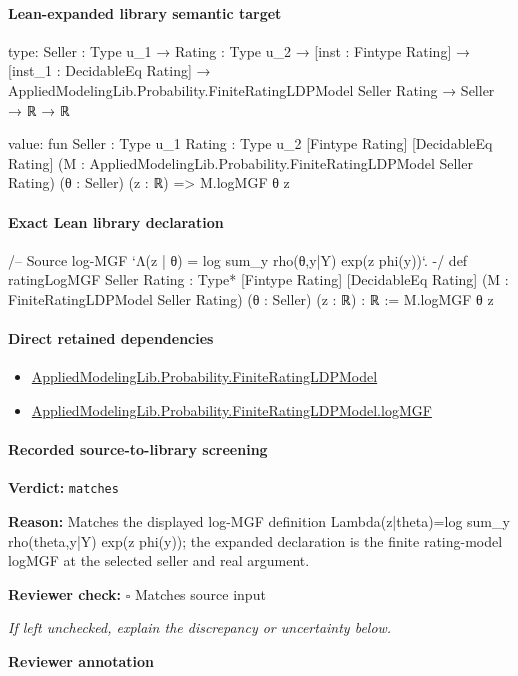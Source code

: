 \documentclass[10pt]{article}
\newcommand{\reviewerbox}{%
  \par\noindent\fbox{\parbox{0.96\linewidth}{\rule{0pt}{0.38in}}}\par
}
\newcommand{\reviewmatch}[1]{%
  \par\noindent\textbf{Reviewer check:} $\square$\; #1\par
  \noindent\emph{If left unchecked, explain the discrepancy or uncertainty below.}\par
}
\begin{document}
\paragraph{Lean-expanded library semantic target}
\begin{ReviewVerbatim}
type:
{Seller : Type u_1} →
  {Rating : Type u_2} →
    [inst : Fintype Rating] →
      [inst_1 : DecidableEq Rating] → AppliedModelingLib.Probability.FiniteRatingLDPModel Seller Rating → Seller → ℝ → ℝ

value:
fun {Seller : Type u_1} {Rating : Type u_2} [Fintype Rating] [DecidableEq Rating]
    (M : AppliedModelingLib.Probability.FiniteRatingLDPModel Seller Rating) (θ : Seller) (z : ℝ) =>
  M.logMGF θ z
\end{ReviewVerbatim}

\paragraph{Exact Lean library declaration}
\begin{ReviewVerbatim}
/-- Source log-MGF `Λ(z | θ) = log sum_y rho(θ,y|Y) exp(z phi(y))`. -/
def ratingLogMGF {Seller Rating : Type*} [Fintype Rating] [DecidableEq Rating]
    (M : FiniteRatingLDPModel Seller Rating) (θ : Seller) (z : ℝ) : ℝ :=
  M.logMGF θ z
\end{ReviewVerbatim}

\paragraph{Direct retained dependencies}
\begin{itemize}\raggedright
\item \hyperlink{governing-declaration-765e92a42a7a9947}{Applied\allowbreak{}Modeling\allowbreak{}Lib.\allowbreak{}Probability.\allowbreak{}Finite\allowbreak{}Rating\allowbreak{}LDP\allowbreak{}Model}
\item \hyperlink{governing-declaration-d36626616b1c1c7d}{Applied\allowbreak{}Modeling\allowbreak{}Lib.\allowbreak{}Probability.\allowbreak{}Finite\allowbreak{}Rating\allowbreak{}LDP\allowbreak{}Model.\allowbreak{}log\allowbreak{}MGF}
\end{itemize}
\paragraph{Recorded source-to-library screening}
\textbf{Verdict:} \texttt{matches}
\\
{\raggedright
\textbf{Reason:} Matches the displayed log-\allowbreak{}MGF definition Lambda(z|theta)=log sum\_\allowbreak{}y rho(theta,y|Y) exp(z phi(y));\allowbreak{} the expanded declaration is the finite rating-\allowbreak{}model logMGF at the selected seller and real argument.\allowbreak{}
\par}
\reviewmatch{Matches source input}
\noindent\textbf{Reviewer annotation}\par
\reviewerbox
\clearpage
\hypertarget{library-prerequisite-683e7978382b65db}{}
\end{document}
